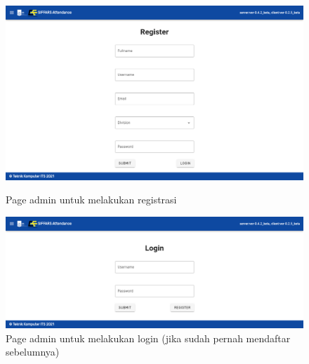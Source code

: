 \begin{figure} [p] \centering
  \includegraphics[scale=0.2]{gambar/register.png}
  \caption{Page admin untuk melakukan registrasi}
  \label{fig:SfRegis}
  
  \includegraphics[scale=0.2]{gambar/login.png}
  \caption{Page admin untuk melakukan login (jika sudah pernah mendaftar sebelumnya)}
  \label{fig:SfLogin}
\end{figure}

